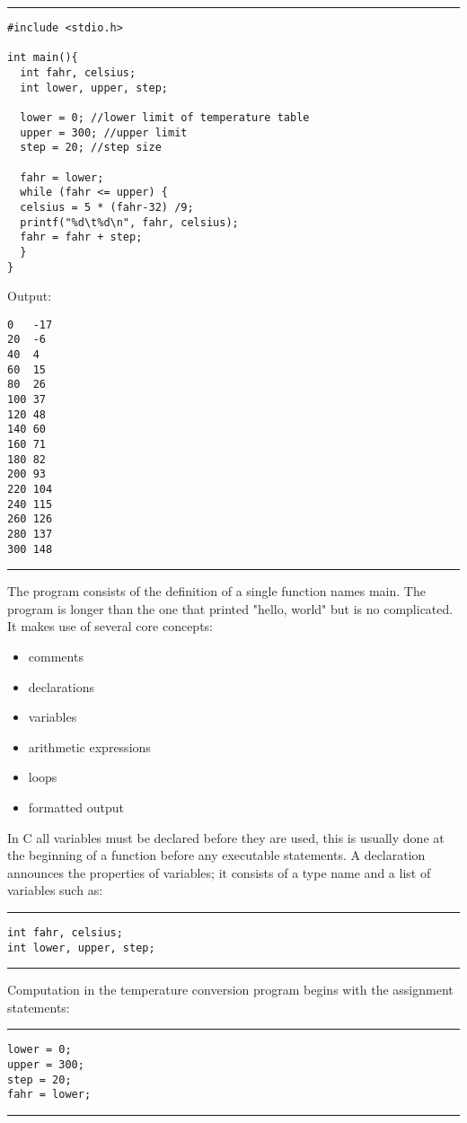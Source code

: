\documentclass[a4paper]{article}
\begin{document}
\noindent\rule{\textwidth}{0.5pt}
\begin{verbatim}
#include <stdio.h>

int main(){
  int fahr, celsius;
  int lower, upper, step;

  lower = 0; //lower limit of temperature table
  upper = 300; //upper limit
  step = 20; //step size

  fahr = lower;
  while (fahr <= upper) {
  celsius = 5 * (fahr-32) /9;
  printf("%d\t%d\n", fahr, celsius);
  fahr = fahr + step;
  }
}
\end{verbatim}
Output:
\begin{verbatim}
0	-17
20	-6
40	4
60	15
80	26
100	37
120	48
140	60
160	71
180	82
200	93
220	104
240	115
260	126
280	137
300	148
\end{verbatim}

\noindent\rule{\textwidth}{0.5pt}
The program consists of the definition of a single function names main. The
program is longer than the one that printed "hello, world" but is no
complicated. It makes use of several core concepts:
\begin{itemize}
\item comments
\item declarations
\item variables
\item arithmetic expressions
\item loops
\item formatted output
\end{itemize}

In C all variables must be declared before they are used, this is usually done
at the beginning of a function before any executable statements. A declaration
announces the properties of variables; it consists of a type name and a list of
variables such as:

\noindent\rule{\textwidth}{0.5pt}
\begin{verbatim}
int fahr, celsius;
int lower, upper, step;
\end{verbatim}

\noindent\rule{\textwidth}{0.5pt}

Computation in the temperature conversion program begins with the assignment
statements:

\noindent\rule{\textwidth}{0.5pt}
\begin{verbatim}
lower = 0;
upper = 300;
step = 20;
fahr = lower;
\end{verbatim}

\noindent\rule{\textwidth}{0.5pt}
\end{document}
